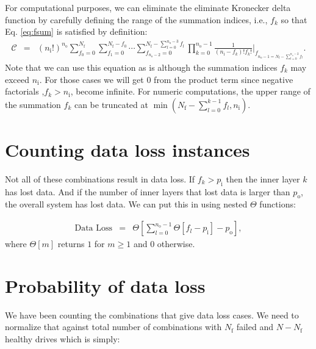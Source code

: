 \documentclass[journal]{IEEEtran}
\begin{document}
For computational purposes, we can eliminate the eliminate Kronecker delta function by carefully defining the range of the summation indices, i.e., \(f_k\) so that Eq. \eqref{eq:fsum} is satisfied by definition:
\begin{eqnarray}
\mathcal{C}&=& \left(n_\text{i}!\right)^{n_\text{o}}  \sum_{f_0=0}^{N_\text{f}}\sum_{f_1=0}^{N_\text{f}-f_0}\cdots \sum_{f_{n_\text{o}-2}=0}^{N_\text{f}-\sum_{l=0}^{n_\text{o}-3}f_l} {\displaystyle \prod_{k=0}^{n_\text{o}-1}} \frac{1}{(n_\text{i}-f_k)!f_k!}\bigg\rvert_{f_{ n_\text{o}-1=N_\text{f}-\sum_{l=0}^{n_\text{o}-2}f_l}}.
\label{eq:tcfs2}
\end{eqnarray}
Note that we can use this equation as is although the summation indices \(f_k\) may exceed \(n_\text{i}\). For those cases we will get \(0\) from the product term since negative factorials ,\(f_k>n_\text{i}\), become infinite. For numeric computations, the upper range of the summation \(f_k\) can be truncated at \(\min(N_\text{f}-\sum_{l=0}^{k-1}f_l, n_\text{i})\).

\hypertarget{counting-data-loss-instances}{%
\section{Counting data loss instances}\label{counting-data-loss-instances}}

Not all of these combinations result in data loss. If \(f_k>p_\text{i}\) then the inner layer \(k\) has lost data. And if the number of inner layers that lost data is larger than \(p_\text{o}\), the overall system has lost data. We can put this in using nested \(\Theta\) functions:

\begin{eqnarray}
\text{Data Loss}&=& \Theta\left[  \sum_{l=0}^{n_\text{o}-1}  \Theta \left[f_l-p_\text{i} \right]-p_\text{o}     \right],
\label{eq:theta}
\end{eqnarray}
where \(\Theta[m]\) returns \(1\) for \(m\geq 1\) and \(0\) otherwise.

\hypertarget{probability-of-data-loss}{%
\section{Probability of data loss}\label{probability-of-data-loss}}

We have been counting the combinations that give data loss cases. We need to normalize that against total number of combinations with \(N_\text{f}\) failed and \(N-N_\text{f}\) healthy drives which is simply:
\end{document}
